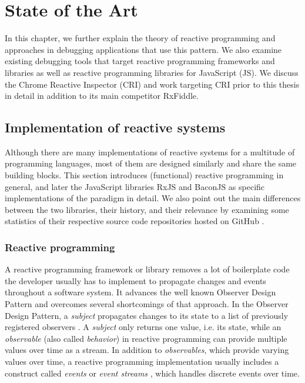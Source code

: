 \chapter{State of the Art}
\label{ch:StateOfTheArt}
In this chapter, we further explain the theory of reactive programming and approaches in debugging applications that use this pattern. We also examine existing debugging tools that target reactive programming frameworks and libraries as well as reactive programming libraries for JavaScript (JS). We discuss the Chrome Reactive Inspector (CRI) and work targeting CRI prior to this thesis in detail in addition to its main competitor RxFiddle.

\section{Implementation of reactive systems}
Although there are many implementations of reactive systems for a multitude of programming languages, most of them are designed similarly and share the same building blocks. This section introduces (functional) reactive programming in general, and later the JavaScript libraries RxJS and BaconJS as specific implementations of the paradigm in detail. We also point out the main differences between the two libraries, their history, and their relevance by examining some statistics of their respective source code repositories hosted on GitHub \cite{RxJSRepo} \cite{BaconJSRepo}. %

	\subsection{Reactive programming}
	A reactive programming framework or library removes a lot of boilerplate code the developer usually has to implement to propagate changes and events throughout a software system. It advances the well known Observer Design Pattern and overcomes several shortcomings of that approach. In the Observer Design Pattern, a \emph{subject} propagates changes to its state to a list of previously registered observers \cite{FRP}. A \emph{subject} only returns one value, i.e. its state, while an \emph{observable} (also called \emph{behavior}) in reactive programming can provide multiple values over time as a stream.
	In addition to \emph{observables}, which provide varying values over time, a reactive programming implementation usually includes a construct called \emph{events} or \emph{event streams} \cite{BaconJS}, which handles discrete events over time.
	
